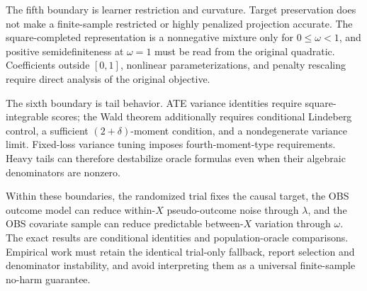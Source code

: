 The fifth boundary is learner restriction and curvature. Target preservation does not make a finite-sample restricted or highly penalized projection accurate. The square-completed representation is a nonnegative mixture only for $0\leq\omega<1$, and positive semidefiniteness at $\omega=1$ must be read from the original quadratic. Coefficients outside $[0,1]$, nonlinear parameterizations, and penalty rescaling require direct analysis of the original objective.

The sixth boundary is tail behavior. ATE variance identities require square-integrable scores; the Wald theorem additionally requires conditional Lindeberg control, a sufficient $(2+\delta)$-moment condition, and a nondegenerate variance limit. Fixed-loss variance tuning imposes fourth-moment-type requirements. Heavy tails can therefore destabilize oracle formulas even when their algebraic denominators are nonzero.

Within these boundaries, the randomized trial fixes the causal target, the OBS outcome model can reduce within-$X$ pseudo-outcome noise through $\lambda$, and the OBS covariate sample can reduce predictable between-$X$ variation through $\omega$. The exact results are conditional identities and population-oracle comparisons. Empirical work must retain the identical trial-only fallback, report selection and denominator instability, and avoid interpreting them as a universal finite-sample no-harm guarantee.
